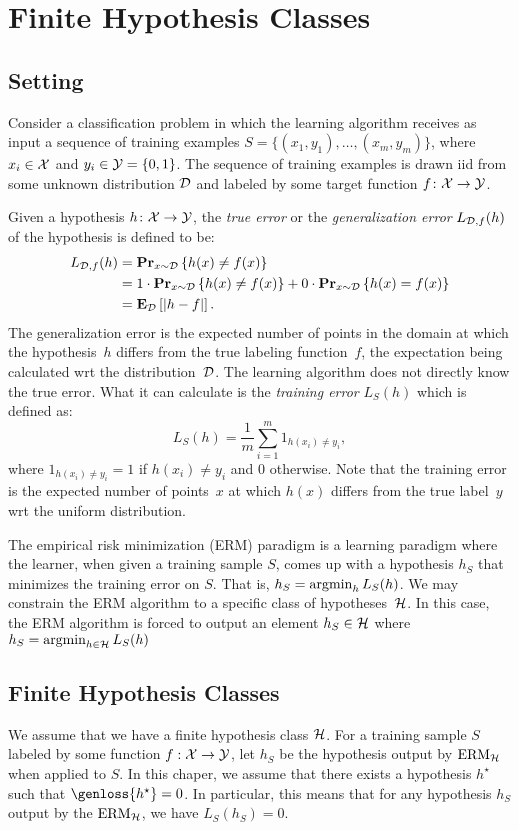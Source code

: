 \chapter{Finite Hypothesis Classes}

\section{Setting}

Consider a classification problem in which the learning algorithm receives as input
a sequence of training examples $S = \{(x_1, y_1), \ldots, (x_m, y_m)\}$,
where $x_i \in \mathcal{X}$ and $y_i \in \mathcal{Y} = \{0, 1\}$. The sequence of training
examples is drawn iid from some unknown distribution $\mathcal{D}$ and labeled by some
target function $f \colon \mathcal{X} \rightarrow \mathcal{Y}$.

Given a hypothesis $h \colon \mathcal{X} \rightarrow \mathcal{Y}$, the \emph{true error}
or the \emph{generalization error} $L_{\mathcal{D}, f}(h)$ of the hypothesis is defined to be:
\begin{align*}
    L_{\mathcal{D}, f}(h) & = \mathbf{Pr}_{x \sim \mathcal{D}} \left \{ h(x) \neq f(x) \right \} \\
                 & = 1 \cdot \mathbf{Pr}_{x \sim \mathcal{D}} \left \{ h(x) \neq f(x) \right \} +
                     0 \cdot \mathbf{Pr}_{x \sim \mathcal{D}} \left \{ h(x) = f(x) \right \} \\
                 & = \mathbf{E}_{\mathcal{D}} \left [ \lvert h - f \rvert \right ].
\end{align*}
The generalization error is the expected number of points in the domain at which
the hypothesis~$h$ differs from the true labeling function~$f$, the expectation being
calculated wrt the distribution~$\mathcal{D}$. The learning
algorithm does not directly know the true error. What it can calculate
is the \emph{training error} $L_{S}(h)$ which is defined as:
\[
    L_S (h) = \frac{1}{m} \sum_{i = 1}^{m} 1_{h(x_i) \neq y_i},
\]
where $1_{h(x_i) \neq y_i} =  1$ if $h(x_i) \neq y_i$ and $0$ otherwise. Note that
the training error is the expected number of points~$x$ at which $h(x)$ differs from
the true label~$y$ wrt the uniform distribution.

The empirical risk minimization (ERM) paradigm is a learning paradigm where the learner,
when given a training sample $S$, comes up with a hypothesis $h_S$ that minimizes
the training error on $S$. That is, $h_S = \operatorname{argmin}_{h} L_S(h)$. We may
constrain the ERM algorithm to a specific class of hypotheses~$\mathcal{H}$. In this
case, the ERM algorithm is forced to output an element $h_S \in \mathcal{H}$ where
$h_S = \operatorname{argmin}_{h \in \mathcal{H}} L_S(h)$


\section{Finite Hypothesis Classes}

We assume that we have a finite hypothesis class $\mathcal{H}$. For a training
sample $S$ labeled by some function $f: \mathcal{X} \rightarrow \mathcal{Y}$, let $h_S$
be the hypothesis output by $\text{ERM}_{\mathcal{H}}$ when applied to $S$. In this chaper,
we assume that there exists a hypothesis $h^{\star}$ such that
$\genloss{h^{\star}} = 0$. In particular, this means that for any hypothesis $h_S$
output by the $\text{ERM}_{\mathcal{H}}$, we have $L_S(h_S) = 0$.

